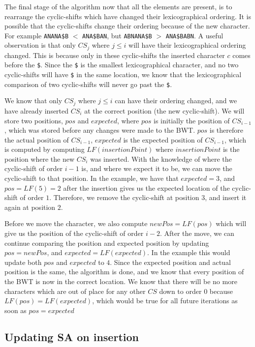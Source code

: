 The final stage of the algorithm now that all the elements are present, is to rearrange
the cyclic-shifts which have changed their lexicographical ordering. It is possible that
the cyclic-shifts change their ordering because of the new character. For example
\verb|ANANA$B| $<$ \verb|ANA$BAN|, but \verb|ABNANA$B| $>$ \verb|ANA$BABN|. A useful
observation is that only $CS_j$ where $j \leq i$ will have their lexicographical ordering
changed. This is because only in these cyclic-shifts the inserted character $c$ comes
before the \verb|$|. Since the \verb|$| is the smallest lexicographical character, and no
two cyclic-shifts will have \verb|$| in the same location, we know that the
lexicographical comparison of two cyclic-shifts will never go past the \verb|$|.

We know that only $CS_j$ where $j \leq i$ can have their ordering changed, and we have
already inserted $CS_i$ at the correct position (the new cyclic-shift). We will store two
positions, $pos$ and $expected$, where $pos$ is initially the position of $CS_{i - 1}$,
which was stored before any changes were made to the BWT. $pos$ is therefore the actual
position of $CS_{i - 1}$, $expected$ is the expected position of $CS_{i - 1}$, which is
computed by computing $LF(insertionPoint)$ where $insertionPoint$ is the position where
the new $CS_i$ was inserted. With the knowledge of where the cyclic-shift of order $i - 1$
is, and where we expect it to be, we can move the cyclic-shift to that position. In the
example, we have that $expected = 3$, and $pos = LF(5) = 2$ after the insertion gives us
the expected location of the cyclic-shift of order $1$. Therefore, we remove the
cyclic-shift at position $3$, and insert it again at position $2$.

Before we move the character, we also compute $newPos = LF(pos)$ which will give us the
position of the cyclic-shift of order $i - 2$. After the move, we can continue comparing
the position and expected position by updating $pos = newPos$, and $expected =
LF(expected)$. In the example this would update both $pos$ and $expected$ to $4$. Since
the expected position and actual position is the same, the algorithm is done, and we know
that every position of the BWT is now in the correct location. We know that there will be
no more characters which are out of place for any other $CS$ down to order $0$ because
$LF(pos) = LF(expected)$, which would be true for all future iterations as soon as $pos =
expected$

\subsection*{Updating SA on insertion}

